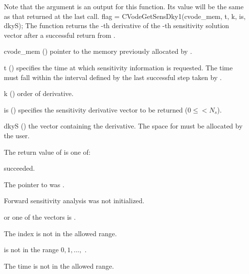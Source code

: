 {
  Note that the argument  is an output for this function. Its value will be
  the same as that returned at the last  call.
}
{
  flag = CVodeGetSensDky1(cvode\_mem, t, k, is, dkyS);
}
{
  The function  returns the -th derivative of the 
  -th sensitivity solution vector after a successful return from .
}
{
  \begin{args}
  \item[cvode\_mem] ()
    pointer to the memory previously allocated by .
  \item[t] ()
    specifies the time at which sensitivity information is 
    requested. The time  must fall within the interval defined by the last 
    successful step taken by {\cvodes}.
  \item[k] () order of derivative.
  \item[is] () specifies the sensitivity derivative vector to be returned
    ($0\le$$< N_s$).
  \item[dkyS] ()
    the vector containing the derivative. The space for  must be allocated by 
    the user. 
  \end{args}
}
{
  The return value  of  is one of:
  \begin{args}
  \item[\Id{CV\_SUCCESS}] 
     succeeded.
  \item[\Id{CV\_MEM\_NULL}] 
    The pointer to  was .
  \item[\Id{CV\_NO\_SENS}] 
    Forward sensitivity analysis was not initialized.
  \item[\Id{CV\_BAD\_DKY}] 
     or one of the vectors  is .
  \item[\Id{CV\_BAD\_IS}]
    The index  is not in the allowed range.
  \item[\Id{CV\_BAD\_K}] 
     is not in the range $0, 1, ...,$ .
  \item[\Id{CV\_BAD\_T}] 
    The time  is not in the allowed range.
  \end{args}
}
{}

